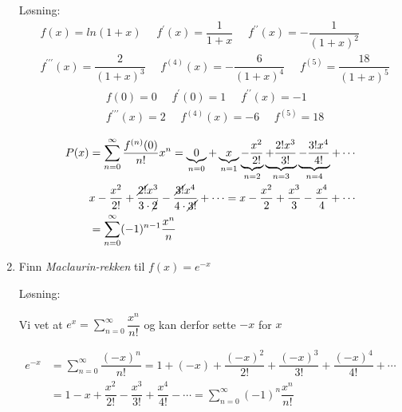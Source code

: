 \documentclass[11pt]{article}
\theoremstyle{definition}
\theoremstyle{definition}
\theoremstyle{definition}
\theoremstyle{definition}
\theoremstyle{definition}
\theoremstyle{definition}
\begin{document}
\begin{enumerate}
			Løsning:
			\begin{align*}
			&f(x)=ln(1+x) \hspace{16pt} f^{\prime}(x)=\dfrac{1}{1+x} \hspace{16pt} f^{\prime \prime}(x)=-\dfrac{1}{(1+x)^2} \hspace{16pt} \\ 
			&f^{\prime \prime \prime}(x)=\dfrac{2	}{(1+x)^3} \hspace{16pt} f^{(4)}(x)=-\dfrac{6}{(1+x)^4}
			\hspace{16pt} f^{(5)}=\dfrac{18}{(1+x)^5}
			\end{align*}
			\begin{align*}
			&f(0)=0 \hspace{16pt} f^{\prime}(0)=1 \hspace{16pt} f^{\prime \prime}(x)=-1 \hspace{16pt} \\ 
			&f^{\prime \prime \prime}(x)=2 \hspace{16pt} f^{(4)}(x)=-6
			\hspace{16pt} f^{(5)}=18
			\end{align*}
			
			\begin{align*}
			P(x)&=\sum_{n=0}^{\infty}
			 \dfrac{f^{(n)}(0)}{n!}x^n=
			\underbrace{0}_{n=0}+\underbrace{x}_{n=1}\underbrace{-\dfrac{x^2}{2!}}_{n=2}\underbrace{+\dfrac{2!x^3}{3!}}_{n=3}\underbrace{-\dfrac{3!x^4}{4!}}_{n=4}+\cdots\\
			&x-\dfrac{x^2}{2!}+\dfrac{\cancel{2!}x^3}{3\cdot \cancel{2}}-\dfrac{\cancel{3!}x^4}{4\cdot \cancel{3!}}+\cdots = x-\dfrac{x^2}{2}+\dfrac{x^3}{3}-\dfrac{x^4}{4}+\cdots\\
			&=\sum_{n=0}^{\infty} (-1)^{n-1} \dfrac{x^{n}}{n}
			\end{align*}
			
			\newpage
			
			\item Finn \textit{Maclaurin-rekken} til \(f(x)=e^{-x}\)
			
		    Løsning:
		    
		    Vi vet at \(e^x=\displaystyle{ \sum_{n=0}^{\infty}}\dfrac{x^n}{n!}\) og kan derfor sette \(-x\) for \(x\)
		    
		    \begin{align*}
		    e^{-x}&=\sum_{n=0}^{\infty}\dfrac{(-x)^n}{n!}=1+(-x)+\dfrac{(-x)^2}{2!}+\dfrac{(-x)^3}{3!}+\dfrac{(-x)^4}{4!}+\cdots\\
		    &=1-x+\dfrac{x^2}{2!}-\dfrac{x^3}{3!}+\dfrac{x^4}{4!}-\cdots=\sum_{n=0}^{\infty}(-1)^n\dfrac{x^n}{n!}
		    \end{align*}
		    

\end{enumerate}
\end{document}
